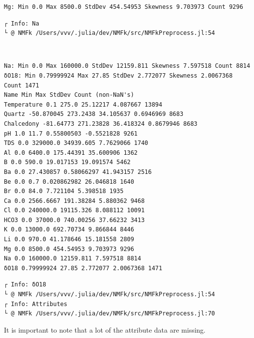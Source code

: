 \documentclass[11pt]{article}
\begin{document}
    \begin{Verbatim}[commandchars=\\\{\}]
Mg: Min 0.0 Max 8500.0 StdDev 454.54953 Skewness 9.703973 Count 9296
    \end{Verbatim}

    \begin{Verbatim}[commandchars=\\\{\}]
┌ Info: Na
└ @ NMFk /Users/vvv/.julia/dev/NMFk/src/NMFkPreprocess.jl:54
    \end{Verbatim}

    \begin{center}
    \end{center}
    { \hspace*{\fill} \\}
    
    \begin{Verbatim}[commandchars=\\\{\}]
Na: Min 0.0 Max 160000.0 StdDev 12159.811 Skewness 7.597518 Count 8814
δO18: Min 0.79999924 Max 27.85 StdDev 2.772077 Skewness 2.0067368 Count 1471
Name Min Max StdDev Count (non-NaN's)
Temperature 0.1 275.0 25.12217 4.087667 13894
Quartz -50.870045 273.2438 34.105637 0.6946969 8683
Chalcedony -81.64773 271.23828 36.418324 0.8679946 8683
pH 1.0 11.7 0.55800503 -0.5521828 9261
TDS 0.0 329000.0 34939.605 7.7629066 1740
Al 0.0 6400.0 175.44391 35.600906 1362
B 0.0 590.0 19.017153 19.091574 5462
Ba 0.0 27.430857 0.58066297 41.943157 2516
Be 0.0 0.7 0.020862982 26.046818 1640
Br 0.0 84.0 7.721104 5.398518 1935
Ca 0.0 2566.6667 191.38284 5.880362 9468
Cl 0.0 240000.0 19115.326 8.088112 10091
HCO3 0.0 37000.0 740.00256 37.66232 3413
K 0.0 13000.0 692.70734 9.866844 8446
Li 0.0 970.0 41.178646 15.181558 2809
Mg 0.0 8500.0 454.54953 9.703973 9296
Na 0.0 160000.0 12159.811 7.597518 8814
δO18 0.79999924 27.85 2.772077 2.0067368 1471
    \end{Verbatim}

    \begin{Verbatim}[commandchars=\\\{\}]
┌ Info: δO18
└ @ NMFk /Users/vvv/.julia/dev/NMFk/src/NMFkPreprocess.jl:54
┌ Info: Attributes
└ @ NMFk /Users/vvv/.julia/dev/NMFk/src/NMFkPreprocess.jl:70
    \end{Verbatim}

    It is important to note that a lot of the attribute data are missing.
\end{document}
